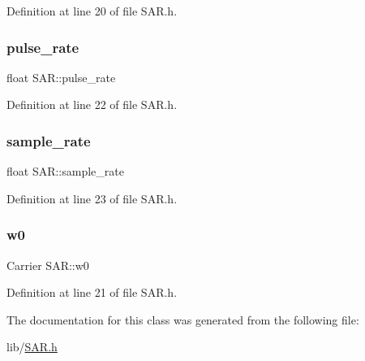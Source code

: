 Definition at line 20 of file S\+A\+R.\+h.

\mbox{\label{class_s_a_r_ad85918c46f8ea542f28a65a2f45b3962}} 
\subsubsection{\texorpdfstring{pulse\+\_\+rate}{pulse\_rate}}
{\footnotesize\ttfamily float S\+A\+R\+::pulse\+\_\+rate}



Definition at line 22 of file S\+A\+R.\+h.

\mbox{\label{class_s_a_r_aca187a89a350101ca7d1fad4d432f27b}} 
\subsubsection{\texorpdfstring{sample\+\_\+rate}{sample\_rate}}
{\footnotesize\ttfamily float S\+A\+R\+::sample\+\_\+rate}



Definition at line 23 of file S\+A\+R.\+h.

\mbox{\label{class_s_a_r_a6108faaee083fa177cf3b837486a667f}} 
\subsubsection{\texorpdfstring{w0}{w0}}
{\footnotesize\ttfamily Carrier S\+A\+R\+::w0}



Definition at line 21 of file S\+A\+R.\+h.



The documentation for this class was generated from the following file\+:\begin{DoxyCompactItemize}
\item 
lib/\hyperlink{_s_a_r_8h}{S\+A\+R.\+h}\end{DoxyCompactItemize}
